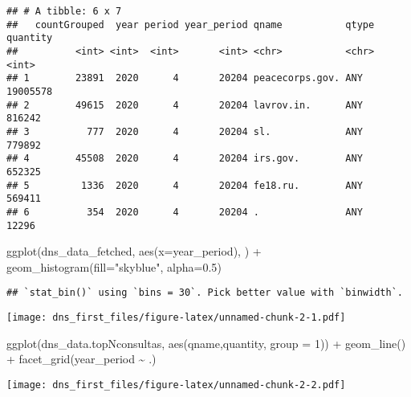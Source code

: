 \documentclass[
]{article}
\newenvironment{Shaded}{\begin{snugshade}}{\end{snugshade}}
\newcommand{\AttributeTok}[1]{\textcolor[rgb]{0.77,0.63,0.00}{#1}}
\newcommand{\DecValTok}[1]{\textcolor[rgb]{0.00,0.00,0.81}{#1}}
\newcommand{\FloatTok}[1]{\textcolor[rgb]{0.00,0.00,0.81}{#1}}
\newcommand{\FunctionTok}[1]{\textcolor[rgb]{0.00,0.00,0.00}{#1}}
\newcommand{\NormalTok}[1]{#1}
\newcommand{\SpecialCharTok}[1]{\textcolor[rgb]{0.00,0.00,0.00}{#1}}
\newcommand{\StringTok}[1]{\textcolor[rgb]{0.31,0.60,0.02}{#1}}
\begin{document}
\begin{verbatim}
## # A tibble: 6 x 7
##   countGrouped  year period year_period qname           qtype quantity
##          <int> <int>  <int>       <int> <chr>           <chr>    <int>
## 1        23891  2020      4       20204 peacecorps.gov. ANY   19005578
## 2        49615  2020      4       20204 lavrov.in.      ANY     816242
## 3          777  2020      4       20204 sl.             ANY     779892
## 4        45508  2020      4       20204 irs.gov.        ANY     652325
## 5         1336  2020      4       20204 fe18.ru.        ANY     569411
## 6          354  2020      4       20204 .               ANY      12296
\end{verbatim}

\begin{Shaded}
\begin{Highlighting}[]
\FunctionTok{ggplot}\NormalTok{(dns\_data\_fetched, }\FunctionTok{aes}\NormalTok{(}\AttributeTok{x=}\NormalTok{year\_period), ) }\SpecialCharTok{+} \FunctionTok{geom\_histogram}\NormalTok{(}\AttributeTok{fill=}\StringTok{"skyblue"}\NormalTok{, }\AttributeTok{alpha=}\FloatTok{0.5}\NormalTok{) }
\end{Highlighting}
\end{Shaded}

\begin{verbatim}
## `stat_bin()` using `bins = 30`. Pick better value with `binwidth`.
\end{verbatim}

\texttt{[image: dns\_first\_files/figure-latex/unnamed-chunk-2-1.pdf]}

\begin{Shaded}
\begin{Highlighting}[]
\FunctionTok{ggplot}\NormalTok{(dns\_data.topNconsultas, }\FunctionTok{aes}\NormalTok{(qname,quantity, }\AttributeTok{group =} \DecValTok{1}\NormalTok{)) }\SpecialCharTok{+} \FunctionTok{geom\_line}\NormalTok{() }\SpecialCharTok{+} \FunctionTok{facet\_grid}\NormalTok{(year\_period }\SpecialCharTok{\textasciitilde{}}\NormalTok{ .)}
\end{Highlighting}
\end{Shaded}

\texttt{[image: dns\_first\_files/figure-latex/unnamed-chunk-2-2.pdf]}
\end{document}

